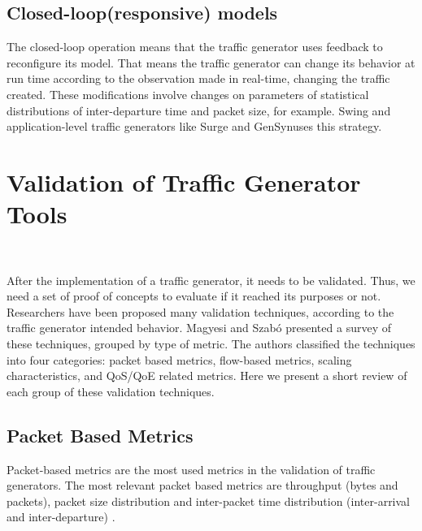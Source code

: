 \subsection{Closed-loop(responsive) models}

The closed-loop operation means that the traffic generator uses feedback to reconfigure its model. That means the traffic generator can change its behavior at run time according to the observation made in real-time, changing the traffic created. These modifications involve changes on parameters of statistical distributions of inter-departure time and packet size, for example. Swing\cite{swing-paper} and application-level traffic generators like Surge\cite{surge-paper} and GenSyn\cite{gensyn-paper}uses this strategy.





\section{Validation of Traffic Generator Tools}~\label{sec:validation-traffic-gen}


After the implementation of a traffic generator, it needs to be validated. Thus, we need a set of proof of concepts to evaluate if it reached its purposes or not. Researchers have been proposed many validation techniques, according to the traffic generator intended behavior. Magyesi and Szabó\cite{validate-trafficgen} presented a survey of these techniques, grouped by type of metric. The authors classified the techniques into four categories: packet based metrics, flow-based metrics, scaling characteristics, and \acrfull{QoS}/\acrfull{QoE} related metrics. Here we present a short review of each group of these validation techniques.


\subsection{Packet Based Metrics}

Packet-based metrics are the most used metrics in the validation of traffic generators\cite{validate-trafficgen}. The most relevant packet based metrics are throughput\cite{do-you-trust}\cite{comparative-trafficgen-tools}\cite{performance-trafficgen}\cite{moongen-paper} (bytes and packets), packet size distribution\cite{packet-distribution-model} and inter-packet time distribution (inter-arrival and inter-departure)\cite{sourcesonoff-paper} \cite{ditg-paper}.


